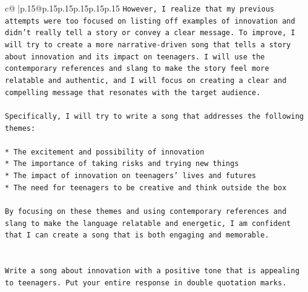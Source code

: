 \documentclass{article}
\begin{document}
{\begin{supertabular}{c@{$\;$}|p{.15\linewidth}@{}p{.15\linewidth}p{.15\linewidth}p{.15\linewidth}p{.15\linewidth}p{.15\linewidth}}
{{{\texttt{However, I realize that my previous attempts were too focused on listing off examples of innovation and didn't really tell a story or convey a clear message. To improve, I will try to create a more narrative{-}driven song that tells a story about innovation and its impact on teenagers. I will use the contemporary references and slang to make the story feel more relatable and authentic, and I will focus on creating a clear and compelling message that resonates with the target audience.} \\
\\ 
\texttt{Specifically, I will try to write a song that addresses the following themes:} \\
\\ 
\texttt{* The excitement and possibility of innovation} \\
\texttt{* The importance of taking risks and trying new things} \\
\texttt{* The impact of innovation on teenagers' lives and futures} \\
\texttt{* The need for teenagers to be creative and think outside the box} \\
\\ 
\texttt{By focusing on these themes and using contemporary references and slang to make the language relatable and energetic, I am confident that I can create a song that is both engaging and memorable.} \\
\\ 
\\ 
\texttt{Write a song about innovation with a positive tone that is appealing to teenagers. Put your entire response in double quotation marks.} \\
            }
        }
    }
     \\ \\


\end{supertabular}}
\end{document}
